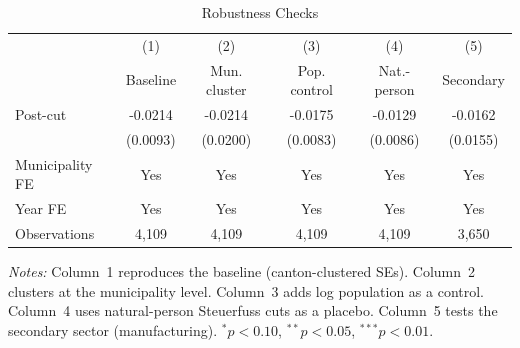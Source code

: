 \begin{table}[htbp]
\centering
\caption{Robustness Checks}
\label{tab:robustness}
\begin{tabular}{lccccc}
\toprule
& (1) & (2) & (3) & (4) & (5) \\
& Baseline & Mun. cluster & Pop. control & Nat.-person & Secondary \\
\midrule
Post-cut & -0.0214 & -0.0214 & -0.0175 & -0.0129 & -0.0162 \\
& (0.0093) & (0.0200) & (0.0083) & (0.0086) & (0.0155) \\
\midrule
Municipality FE & Yes & Yes & Yes & Yes & Yes \\
Year FE & Yes & Yes & Yes & Yes & Yes \\
Observations & 4,109 & 4,109 & 4,109 & 4,109 & 3,650 \\
\bottomrule
\end{tabular}
\begin{tablenotes}[flushleft]
\scriptsize
\item \textit{Notes:} Column~1 reproduces the baseline (canton-clustered SEs). Column~2 clusters at the municipality level. Column~3 adds log population as a control. Column~4 uses natural-person Steuerfuss cuts as a placebo. Column~5 tests the secondary sector (manufacturing). $^{*}p<0.10$, $^{**}p<0.05$, $^{***}p<0.01$.
\end{tablenotes}
\end{table}
